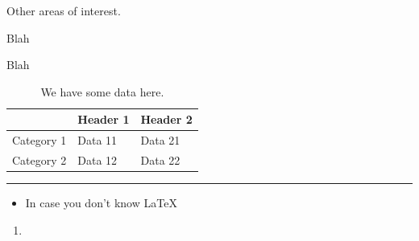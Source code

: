 Other areas of interest.

Blah

Blah

\begin{table}[h]
    \centering
    \begin{tabular}{l|l|l}
    ~          & Header 1 & Header 2 \\ \hline \hline
    Category 1 & Data 11  & Data 21  \\ \hline
    Category 2 & Data 12  & Data 22  \\
    \end{tabular}
    \rule{35em}{0.5pt}
    \caption[Short title here.]{We have some data here.}
\end{table}

\begin{itemize}
\item In case you don't know \LaTeX{}
\end{itemize}

\begin{enumerate}
\item \citet{Tanelli2008}
\end{enumerate}